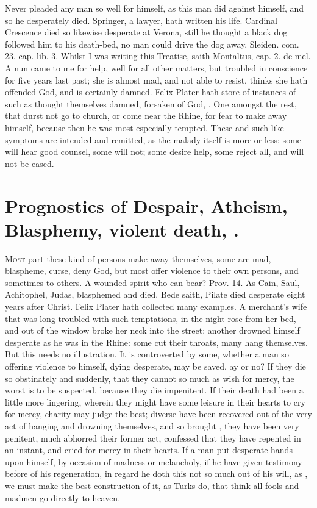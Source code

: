{Never pleaded any man so well for himself, as this man did against
himself, and so he desperately died. Springer, a lawyer, hath written
his life. Cardinal Crescence died so likewise desperate at Verona,
still he thought a black dog followed him to his death-bed, no man
could drive the dog away, Sleiden. com. 23. cap. lib. 3. Whilst I was
writing this Treatise, saith Montaltus, cap. 2. de mel. A nun
came to me for help, well for all other matters, but troubled in
conscience for five years last past; she is almost mad, and not able to
resist, thinks she hath offended God, and is certainly damned. Felix
Plater hath store of instances of such as thought themselves damned,
 forsaken of God, \etc{}. One amongst the rest, that durst not go to
church, or come near the Rhine, for fear to make away himself, because
then he was most especially tempted. These and such like symptoms are
intended and remitted, as the malady itself is more or less; some will
hear good counsel, some will not; some desire help, some reject all,
and will not be eased.

\section[Prognostics of Despair]{Prognostics of Despair, Atheism, Blasphemy, violent death, \etc{}.}

\lettrine{M}{ost} part these kind of persons make away themselves, some are
mad, blaspheme, curse, deny God, but most offer violence to their own
persons, and sometimes to others. A wounded spirit who can bear? Prov.
 14. As Cain, Saul, Achitophel, Judas, blasphemed and died. Bede
saith, Pilate died desperate eight years after Christ. Felix
Plater hath collected many examples. A merchant's wife that was
long troubled with such temptations, in the night rose from her bed,
and out of the window broke her neck into the street: another drowned
himself desperate as he was in the Rhine: some cut their throats, many
hang themselves. But this needs no illustration. It is controverted by
some, whether a man so offering violence to himself, dying desperate,
may be saved, ay or no? If they die so obstinately and suddenly, that
they cannot so much as wish for mercy, the worst is to be suspected,
because they die impenitent. If their death had been a little
more lingering, wherein they might have some leisure in their hearts to
cry for mercy, charity may judge the best; diverse have been recovered
out of the very act of hanging and drowning themselves, and so brought
, they have been very penitent, much abhorred their
former act, confessed that they have repented in an instant, and cried
for mercy in their hearts. If a man put desperate hands upon himself,
by occasion of madness or melancholy, if he have given testimony before
of his regeneration, in regard he doth this not so much out of his
will, as , we must make the best construction of it, as
Turks do, that think all fools and madmen go directly to heaven.

}
